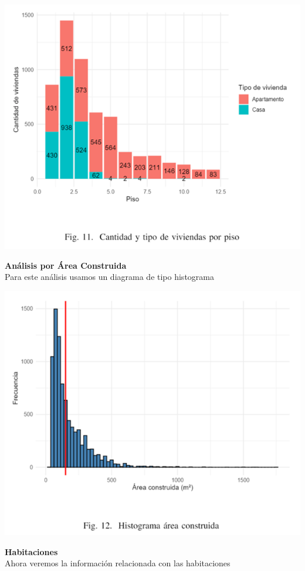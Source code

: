 \documentclass[conference,final,]{IEEEtran}
\begin{document}
\includegraphics[width=1\linewidth]{images/CantTipoPorPiso}

\textbf{Análisis por Área Construida}\\
Para este análisis usamos un diagrama de tipo histograma

\includegraphics[width=1\linewidth]{images/HistogramaAreaConst}

\textbf{Habitaciones}\\
Ahora veremos la información relacionada con las habitaciones
\end{document}

